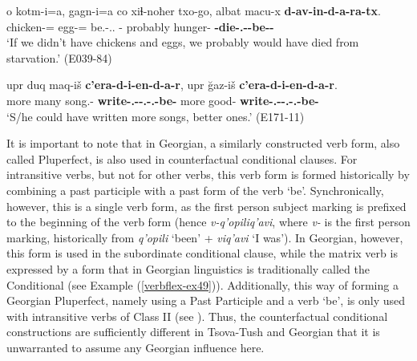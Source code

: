 \begin{exe}
	\ex\label{verbflex-ex29}
	\begin{xlist}
		
		
			\ex\label{verbflex-ex29a}
			\gll o kotm-i=a, gagn-i=a co xiɬ-noħer txo-go, albat macu-x \textbf{d-av-in-d-a-ra-tx}. \\
			{\Dist} chicken-{\Pl}={\Add} egg-{\Pl}={\Add} {\Neg} be.{\Pfv}-{\Nw}.{\Rem}.{\Cond} {\Fpl}-{\Adess} probably hunger-{\Cont} \textbf{{\D}-die-{\Ptcp}.{\Pst}-{\D}-be-{\Imprf}-{\Fpl}} \\
			\trans `If we didn't have chickens and eggs, we probably would have died from starvation.'
			\hfill (E039-84)
		
		
		
			\ex\label{verbflex-ex29b}
			\gll upr duq maq-iš \textbf{c'era-d-i-en-d-a-r}, upr \u{g}az-iš \textbf{c'era-d-i-en-d-a-r}. \\
			more many song.{\Obl}-{\Pl} \textbf{write-{\B}.{\Pl}-{\Tr}-{\Ptcp}.{\Npst}-{\B}.{\Pl}-be-{\Imprf}} more good-{\Adv} \textbf{write-{\B}.{\Pl}-{\Tr}-{\Ptcp}.{\Npst}-{\B}.{\Pl}-be-{\Imprf}} \\
			\trans `S/he could have written more songs, better ones.'
			\hfill (E171-11)
		
		
	\end{xlist}
\end{exe}

It is important to note that in Georgian, a similarly constructed verb form, also called Pluperfect, is also used in counterfactual conditional clauses. For intransitive verbs, but not for other verbs, this verb form is formed historically by combining a past participle with a past form of the verb `be'. Synchronically, however, this is a single verb form, as the first person subject marking is prefixed to the beginning of the verb form (hence \textit{v-q'opiliq'avi}, where \textit{v-} is the first person marking, historically from \textit{q'opili} `been' + \textit{viq'avi} `I was'). In Georgian, however, this form is used in the subordinate conditional clause, while the matrix verb is expressed by a form that in Georgian linguistics is traditionally called the Conditional (see Example (\ref{verbflex-ex49})). Additionally, this way of forming a Georgian Pluperfect, namely using a Past Participle and a verb `be', is only used with intransitive verbs of Class II (see ). Thus, the counterfactual conditional constructions are sufficiently different in Tsova-Tush and Georgian that it is unwarranted to assume any Georgian influence here.

